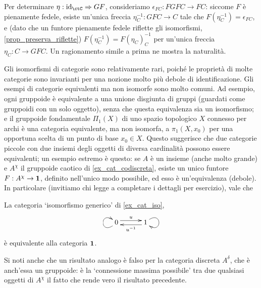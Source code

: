 \begin{remark}
\begin{itemize}
		      Per determinare \(\eta : \Id[\ctC] \nat GF\), consideriamo \(\epsilon_{FC} : FGFC \to FC\): siccome \(F\) è pienamente fedele, esiste un'unica freccia \(\eta^{-1}_C : GFC\to C\) tale che \(F(\eta^{-1}_C) = \epsilon_{FC}\), e (dato che un funtore pienamente fedele riflette gli isomorfismi, \ref{prop_preserva_riflette}) \(F(\eta^{-1}_C)=F(\eta_C)^{-1}_C\) per un'unica freccia \(\eta_C : C\to GFC\). Un ragionamento simile a prima ne mostra la naturalità.
	\end{itemize}
\end{remark}
Gli isomorfismi di categorie sono relativamente rari, poiché le proprietà di molte categorie sono invarianti per una nozione molto più debole di identificazione.
Gli esempi di categorie equivalenti ma non isomorfe sono molto comuni. Ad esempio, ogni gruppoide è equivalente a una unione disgiunta di gruppi (guardati come gruppoidi con un solo oggetto), senza che questa equivalenza sia un isomorfismo; e il gruppoide fondamentale \(\Pi_1(X)\) di uno spazio topologico \(X\) connesso per archi è una categoria equivalente, ma non isomorfa, a \(\pi_1(X,x_0)\) per una opportuna scelta di un punto di base \(x_0\in X\). Questo suggerisce che due categorie piccole con due insiemi degli oggetti di diversa cardinalità possono essere equivalenti; un esempio estremo è questo: se \(A\) è un insieme (anche molto grande) e \(A^\chi\) il gruppoide caotico di \ref{ex_cat_codiscreta}, esiste un unico funtore \(F : A^\chi \to \mathbf{1}\), definito nell'unico modo possibile, ed esso è un'equivalenza (debole). In particolare (invitiamo chi legge a completare i dettagli per esercizio), vale che
\begin{remark}
	La categoria `isomorfismo generico' di \ref{ex_cat_iso},
	\[\xymatrix@C=7ex{0 \ar@<.7ex>[r]^u \ar@(dl,ul)[] & 1 \ar@<.7ex>[l]^{u^{-1}} \ar@(ur,dr)[]}\]
	è equivalente alla categoria \(\mathbf{1}\).
\end{remark}
Si noti anche che un risultato analogo è falso per la categoria discreta $A^\delta$, che è anch'essa un gruppoide: è la `connessione massima possibile' tra due qualsiasi oggetti di $A^\chi$ il fatto che rende vero il risultato precedente.
